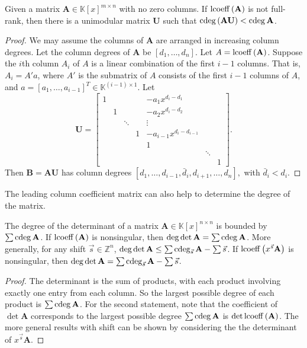 \begin{lem}
\label{lem:columnOperationToReduceDegree}Given a matrix $\mathbf{A}\in\mathbb{K}\left[x\right]^{m\times n}$
with no zero columns. If $\operatorname{lcoeff}\left(\mathbf{A}\right)$ is not
full-rank, then there is a unimodular matrix $\mathbf{U}$ such that
$\cdeg\left(\mathbf{A}\mathbf{U}\right)<\cdeg\mathbf{A}$.\end{lem}
\begin{proof}
We may assume the columns of $\mathbf{A}$ are arranged in increasing
column degrees. Let the column degrees of $\mathbf{A}$ be $\left[d_{1},\dots,d_{n}\right]$.
Let $A=\operatorname{lcoeff}\left(\mathbf{A}\right)$. Suppose the $i$th column
$A_{i}$ of $A$ is a linear combination of the first $i-1$ columns.
That is, $A_{i}=A'a$, where $A'$ is the submatrix of $A$ consists
of the first $i-1$ columns of $A$, and $a=\left[a_{1},\dots,a_{i-1}\right]^{T}\in\mathbb{K}^{(i-1)\times1}$.
Let 
\[
\mathbf{U}=\begin{bmatrix}1 &  &  &  & -a_{1}x^{d_{i}-d_{1}}\\
 & 1 &  &  & -a_{2}x^{d_{i}-d_{2}}\\
 &  & \ddots &  & \vdots\\
 &  &  & 1 & -a_{i-1}x^{d_{i}-d_{i-1}}\\
 &  &  &  & 1\\
 &  &  &  &  & \ddots\\
 &  &  &  &  &  & 1
\end{bmatrix}.
\]
Then $\mathbf{B}=\mathbf{A}\mathbf{U}$ has column degrees $\left[d_{1},\dots,d_{i-1},\bar{d}{}_{i},d_{i+1},\dots,d_{n}\right],$
with $\bar{d}_{i}<d_{i}$.
\end{proof}
The leading column coefficient matrix can also help to determine the
degree of the matrix.
\begin{lem}
\label{lem:fullRankLeadingCoefficientAndDegreeOfDetermant}The degree
of the determinant of a matrix $\mathbf{A}\in\mathbb{K}\left[x\right]^{n\times n}$
is bounded by $\sum\cdeg\mathbf{A}$. If $\operatorname{lcoeff}\left(\mathbf{A}\right)$
is nonsingular, then $\deg\det\mathbf{A}=\sum\cdeg\mathbf{A}$. More
generally, for any shift $\vec{s}\in\mathbb{Z}^{n}$, $\deg\det\mathbf{A}\le\sum\cdeg_{\vec{s}}\mathbf{A}-\sum\vec{s}$.
If $\operatorname{lcoeff}\left(x^{\vec{s}}\mathbf{A}\right)$ is nonsingular, then
$\deg\det\mathbf{A}=\sum\cdeg_{\vec{s}}\mathbf{A}-\sum\vec{s}$.\end{lem}
\begin{proof}
The determinant is the sum of products, with each product involving
exactly one entry from each column. So the largest possible degree
of each product is $\sum\cdeg\mathbf{A}$. For the second statement,
note that the coefficient of $\det\mathbf{A}$ corresponds to the
largest possible degree $\sum\cdeg\mathbf{A}$ is $\det\operatorname{lcoeff}\left(\mathbf{A}\right)$.
The more general results with shift can be shown by considering the
the determinant of $x^{\vec{s}}\mathbf{A}$.
\end{proof}
